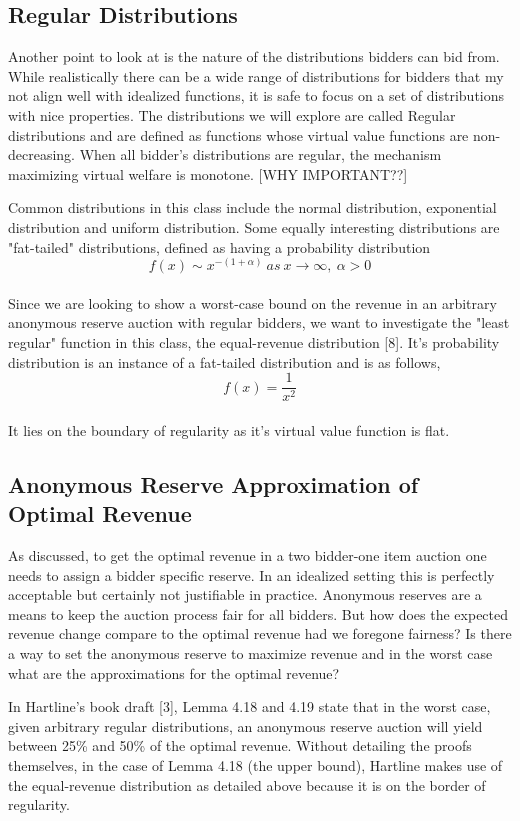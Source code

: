 \documentclass{acm_proc_article-sp}
\begin{document}
\subsection{Regular Distributions}
Another point to look at is the nature of the distributions bidders can bid from. While realistically there can be a wide range of distributions for bidders that my not align well with idealized functions, it is safe to focus on a set of distributions with nice properties. The distributions we will explore are called Regular distributions and are defined as functions whose virtual value functions are non-decreasing. When all bidder's distributions are regular, the mechanism maximizing virtual welfare is monotone. [WHY IMPORTANT??]

Common distributions in this class include the normal distribution, exponential distribution and uniform distribution. Some equally interesting distributions are "fat-tailed" distributions, defined as having a probability distribution \\
\[  f(x) \sim x^{-(1 + \alpha)} \: as \: x \rightarrow \infty ,\: \alpha > 0 \] \\
Since we are looking to show a worst-case bound on the revenue in an arbitrary anonymous reserve auction with regular bidders, we want to investigate the "least regular" function in this class, the equal-revenue distribution [8]. It's probability distribution is an instance of a fat-tailed distribution and is as follows, \\
\[  f(x) = \frac{1}{x^2} \] \\
It lies on the boundary of regularity as it's virtual value function is flat.

\subsection{Anonymous Reserve Approximation of Optimal Revenue}
As discussed, to get the optimal revenue in a two bidder-one item auction one needs to assign a bidder specific reserve. In an idealized setting this is perfectly acceptable but certainly not justifiable in practice. Anonymous reserves are a means to keep the auction process fair for all bidders. But how does the expected revenue change compare to the optimal revenue had we foregone fairness? Is there a way to set the anonymous reserve to maximize revenue and in the worst case what are the approximations for the optimal revenue?

In Hartline's book draft [3], Lemma 4.18 and 4.19 state that in the worst case, given arbitrary regular distributions, an anonymous reserve auction will yield between 25\% and 50\% of the optimal revenue. Without detailing the proofs themselves, in the case of Lemma 4.18 (the upper bound), Hartline makes use of the equal-revenue distribution as detailed above because it is on the border of regularity. 
\end{document}
